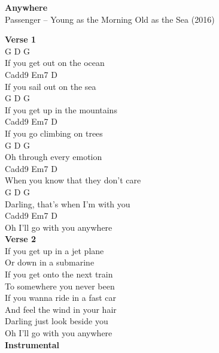 \documentclass[a4paper]{article}
\begin{document}
    \begin{center}
        \textbf{Anywhere}
        ~\\
        Passenger -- Young as the Morning Old as the Sea (2016)
    \end{center}
    {
        \scriptsize
        \textbf{Verse 1}
        ~\\
        {
            \cutive
            \obeyspaces
G           D          G
\\
 If you get out on the ocean
\\
Cadd9        Em7        D
\\
 If you sail out on the sea
\\
G           D         G
\\
 If you get up in the mountains
\\
Cadd9      Em7         D
\\
 If you go climbing on trees
\\
G              D      G
\\
 Oh through every emotion
\\
Cadd9               Em7        D
\\
 When you know that they don't care
\\
G                D        G
\\
 Darling, that's when I'm with you
\\
Cadd9    Em7         D
\\
 Oh I'll go with you anywhere
\\

        }
        \textbf{Verse 2}
        ~\\
        {
            \cutive
            \obeyspaces
If you get up in a jet plane
\\
Or down in a submarine
\\
If you get onto the next train
\\
To somewhere you never been
\\
If you wanna ride in a fast car
\\
And feel the wind in your hair
\\
Darling just look beside you
\\
Oh I'll go with you anywhere
\\

        }
        \textbf{Instrumental}
        ~\\
        {
            \cutive
            \obeyspaces

}}
\end{document}
